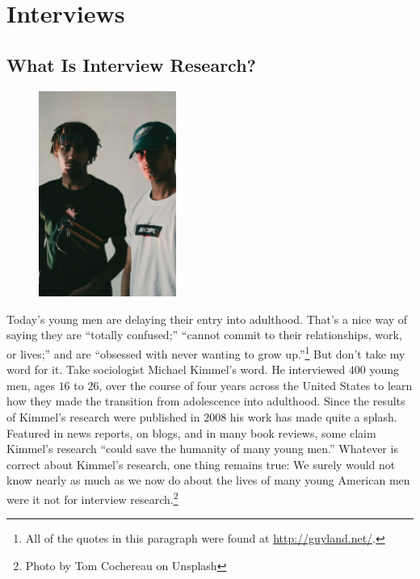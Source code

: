 \chapter{Interviews}\label{ch10:interviews}

\section{What Is Interview Research?}

\begin{figure}
	\centering
	\includegraphics[width=0.4\textwidth]{gfx/09-men} 
\end{figure}

Today's young men are delaying their entry into adulthood. That's a nice way of saying they are ``totally confused;'' ``cannot commit to their relationships, work, or lives;'' and are ``obsessed with never wanting to grow up.''\footnote{All of the quotes in this paragraph were found at \url{http://guyland.net/}.} But don't take my word for it. Take sociologist Michael Kimmel's word. He interviewed $ 400 $ young men, ages $ 16 $ to $ 26 $, over the course of four years across the United States to learn how they made the transition from adolescence into adulthood. Since the results of Kimmel's research were published in $ 2008 $\cite{kimmel2008perilous} his work has made quite a splash. Featured in news reports, on blogs, and in many book reviews, some claim Kimmel's research ``could save the humanity of many young men.'' Whatever is correct about Kimmel's research, one thing remains true: We surely would not know nearly as much as we now do about the lives of many young American men were it not for interview research.\footnote{Photo by Tom Cochereau on Unsplash}

